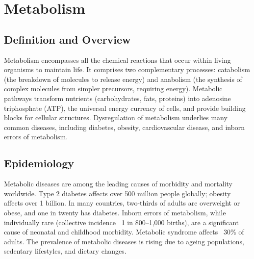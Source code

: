 \chapter{Metabolism}

\section*{Definition and Overview}
Metabolism encompasses all the chemical reactions that occur within living organisms to maintain life. It comprises two complementary processes: catabolism (the breakdown of molecules to release energy) and anabolism (the synthesis of complex molecules from simpler precursors, requiring energy). Metabolic pathways transform nutrients (carbohydrates, fats, proteins) into adenosine triphosphate (ATP), the universal energy currency of cells, and provide building blocks for cellular structures. Dysregulation of metabolism underlies many common diseases, including diabetes, obesity, cardiovascular disease, and inborn errors of metabolism.

\section*{Epidemiology}
Metabolic diseases are among the leading causes of morbidity and mortality worldwide. Type 2 diabetes affects over 500 million people globally; obesity affects over 1 billion. In many countries, two-thirds of adults are overweight or obese, and one in twenty has diabetes. Inborn errors of metabolism, while individually rare (collective incidence ~1 in 800--1,000 births), are a significant cause of neonatal and childhood morbidity. Metabolic syndrome affects ~30\% of adults. The prevalence of metabolic diseases is rising due to ageing populations, sedentary lifestyles, and dietary changes.

